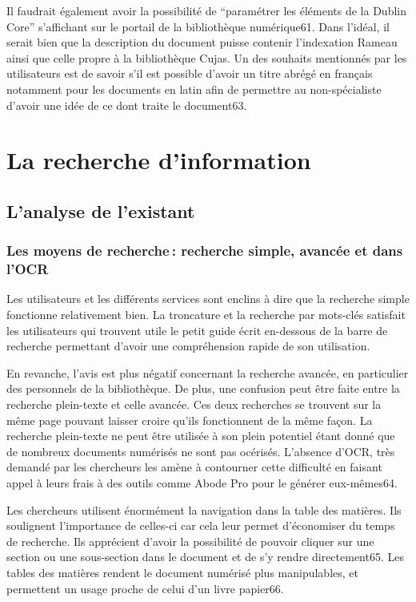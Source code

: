 Il faudrait également avoir la possibilité de \enquote{paramétrer les éléments de la Dublin Core} s’affichant sur le portail de la bibliothèque numérique61. Dans l’idéal, il serait bien que la description du document puisse contenir l’indexation Rameau ainsi que celle propre à la bibliothèque Cujas. Un des souhaits mentionnés par les utilisateurs est de savoir s’il est possible d’avoir un titre abrégé en français notamment pour les documents en latin afin de permettre au non-spécialiste d’avoir une idée de ce dont traite le document63.  



\section{La recherche d’information}

\subsection{L’analyse de l’existant}

\subsubsection{Les moyens de recherche : recherche simple, avancée et dans l’OCR}

Les utilisateurs et les différents services sont enclins à dire que la recherche simple fonctionne relativement bien. La troncature et la recherche par mots-clés satisfait les utilisateurs qui trouvent utile le petit guide écrit en-dessous de la barre de recherche permettant d’avoir une compréhension rapide de son utilisation.  

En revanche, l’avis est plus négatif concernant la recherche avancée, en particulier des personnels de la bibliothèque. De plus, une confusion peut être faite entre la recherche plein-texte et celle avancée. Ces deux recherches se trouvent sur la même page pouvant laisser croire qu’ils fonctionnent de la même façon. La recherche plein-texte ne peut être utilisée à son plein potentiel étant donné que de nombreux documents numérisés ne sont pas océrisés. L’absence d’OCR, très demandé par les chercheurs les amène à contourner cette difficulté en faisant appel à leurs frais à des outils comme Abode Pro pour le générer eux-mêmes64. 

Les chercheurs utilisent énormément la navigation dans la table des matières. Ils soulignent l’importance de celles-ci car cela leur permet d’économiser du temps de recherche. Ils apprécient d’avoir la possibilité de pouvoir cliquer sur une section ou une sous-section dans le document et de s’y rendre directement65. Les tables des matières rendent le document numérisé plus manipulables, et permettent un usage proche de celui d’un livre papier66. 

